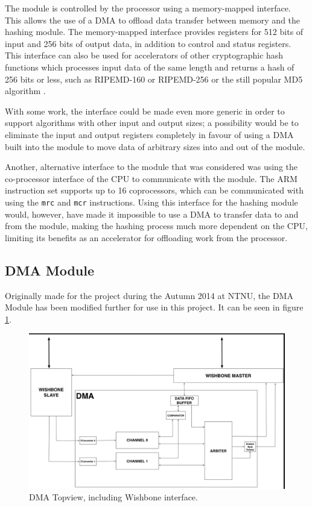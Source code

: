 The module is controlled by the processor using a memory-mapped interface. This allows the use
of a DMA to offload data transfer between memory and the hashing module. The memory-mapped interface
provides registers for 512 bits of input and 256 bits of output data, in addition to control and
status registers. This interface can also be used for accelerators of other cryptographic hash
functions which processes input data of the same length and returns a hash of 256 bits or less,
such as RIPEMD-160 or RIPEMD-256 \cite{ripemd} or the still popular MD5 algorithm \cite{md5}.

With some work, the interface could be made even more generic in order to support algorithms
with other input and output sizes; a possibility would be to eliminate the input and output
registers completely in favour of using a DMA built into the module to move data of arbitrary
sizes into and out of the module.

Another, alternative interface to the module that was considered was using the co-processor interface
of the CPU to communicate with the module. The ARM instruction set supports up to 16 coprocessors,
which can be communicated with using the \texttt{mrc} and \texttt{mcr} instructions. Using this
interface for the hashing module would, however, have made it impossible to use a DMA to transfer
data to and from the module, making the hashing process much more dependent on the CPU, limiting
its benefits as an accelerator for offloading work from the processor.

\subsection{DMA Module}
Originally made for the  project during the Autumn 2014 at NTNU, the DMA Module has been modified further for use in this project.
It can be seen in figure \ref{fig:DMATop}.

\begin{figure}[htb]
    \centering
    \includegraphics[width=1.0\textwidth]{Figures/DMA/DMATopview}
    \caption{DMA Topview, including Wishbone interface.}
    \label{fig:DMATop}
\end{figure}

